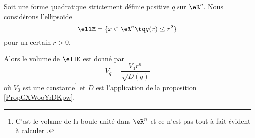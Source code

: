\begin{lemma}       \label{LEMooLSTOooZiEOdx}
    Soit une forme quadratique strictement définie positive \( q\) sur \( \eR^n\). Nous considérons l'ellipsoïde
    \begin{equation}
        \ellE=\{ x\in \eR^n\tq q(x)\leq r^2 \}
    \end{equation}
    pour un certain \( r>0\).

    Alors le volume de \( \ellE\) est donné par
    \begin{equation}
        V_q=\frac{ V_0 r^n }{ \sqrt{ D(q) } }
    \end{equation}
    où \( V_0\) est une constante\footnote{C'est le volume de la boule unité dans \( \eR^n\) et ce n'est pas tout à fait évident à calculer \cite{ooVLVAooXWmUVB}.} et \( D\) est l'application de la proposition \ref{PropOXWooYrDKpw}.
\end{lemma}

